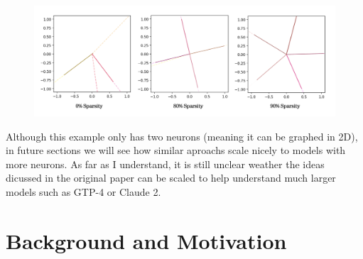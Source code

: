 \documentclass{article} %
\begin{document}
\begin{figure}[h]
    \centering
    \includegraphics[width=0.68\linewidth]{section_1/images/section1_replicated_graphic.png}
    \captionsetup{font=footnotesize} %
    \label{fig:section1_replication}
\end{figure}

Although this example only has two neurons (meaning it can be graphed in 2D), in
future sections we will see how similar aproachs scale nicely to models with more neurons.
As far as I understand, it is still unclear weather the ideas 
dicussed in the original paper can be scaled to help understand 
much larger models such as GTP-4 or Claude 2.



\section{Background and Motivation}
\end{document}
